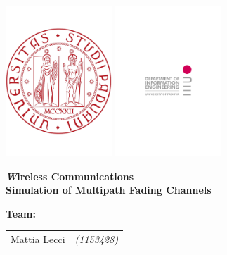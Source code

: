 \begin{titlepage}
	
\centering
{\includegraphics[width=4cm]{img/logo_unipd}
\hspace{7cm}
\includegraphics[width=4cm]{img/logo_dei}
}

\vspace{2cm}
{\bfseries\Large\textit
	Wireless Communications\\
} 
{\bfseries\Huge
	Simulation of Multipath Fading Channels\\
}
\vspace{1cm}
{\large
	\textbf{Team:}
	
	\vspace{5mm}
	
	\normalsize
	\begin{tabular}{ll}
		Mattia Lecci 	& {\footnotesize\textit{(1153428)}} \\ 
	\end{tabular} 
} 
\vfill



\end{titlepage}